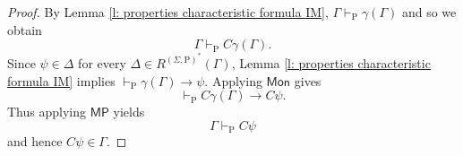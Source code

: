 \documentclass[10pt,a4paper]{amsart}
\newcommand\C {C}
\newcommand{\hickp}{\mathrm{P}}
\begin{document}
\begin{proof}
    \noindent By Lemma \ref{l: properties characteristic formula IM}, $\Gamma \vdash_\mathrm{P} \gamma(\Gamma)$ and so we obtain
    \begin{equation*}
        \Gamma \vdash_\mathrm{P} \C \gamma(\Gamma).
    \end{equation*}
   Since $\psi \in \Delta$ for every $\Delta \in R^{(\Sigma, \hickp)^*}(\Gamma)$, Lemma \ref{l: properties characteristic formula IM} implies $\vdash_\mathrm{P} \gamma(\Gamma) \rightarrow \psi$. Applying $\mathsf{Mon}$ gives
   \begin{equation*}
       \vdash_\mathrm{P} \C \gamma(\Gamma) \rightarrow \C \psi.
   \end{equation*}
   Thus applying $\mathsf{MP}$ yields
   \begin{equation*}
       \Gamma \vdash_\mathrm{P} \C \psi
   \end{equation*}
   and hence $\C \psi \in \Gamma$. \smallskip


\end{proof}
\end{document}

